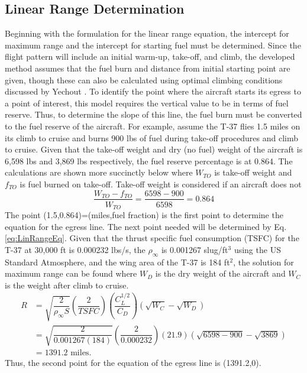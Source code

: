\subsection*{Linear Range Determination}
Beginning with the formulation for the linear range equation, the intercept for maximum range and the intercept for starting fuel must be determined. Since the flight pattern will include an initial warm-up, take-off, and climb, the developed method assumes that the fuel burn and distance from initial starting point are given, though these can also be calculated using optimal climbing conditions discussed by Yechout \cite{IntroACMechanics}. To identify the point where the aircraft starts its egress to a point of interest, this model requires the vertical value to be in terms of fuel reserve. Thus, to determine the slope of this line, the fuel burn must be converted to the fuel reserve of the aircraft. For example, assume the T-37 flies 1.5 miles on its climb to cruise and burns 900 lbs of fuel during take-off procedures and climb to cruise. Given that the take-off weight and dry (no fuel) weight of the aircraft is 6,598 lbs and 3,869 lbs respectively, the fuel reserve percentage is at 0.864. The calculations are shown more succinctly below where $W_{TO}$ is take-off weight and $f_{TO}$ is fuel burned on take-off. Take-off weight is considered if an aircraft does not 
\begin{equation*}
    \dfrac{W_{TO}- f_{TO}}{W_{TO}} = \dfrac{6598-900}{6598} = 0.864
\end{equation*}
The point (1.5,0.864)=(miles,fuel fraction) is the first point to determine the equation for the egress line. The next point needed will be determined by Eq. \ref{eq:LinRangeEq}. Given that the thrust specific fuel consumption (TSFC) for the T-37 at 30,000 ft is 0.000232 lbs/s, the $\rho_\infty$ is 0.001267 slug/ft$^3$ using the US Standard Atmosphere, and the wing area of the T-37 is 184 ft$^2$, the solution for maximum range can be found where $W_D$ is the dry weight of the aircraft and $W_C$ is the weight after climb to cruise.
\begin{align*}
    R  &= \sqrt{\dfrac{2}{\rho_{\infty}S}}\left(\dfrac{2}{TSFC}\right)\left(\dfrac{C_L^{1/2}}{C_D}\right)(\sqrt{W_C}-\sqrt{W_D})\\
    &= \sqrt{\dfrac{2}{0.001267(184)}}\left(\dfrac{2}{0.000232}\right)\left(21.9\right)(\sqrt{6598-900}-\sqrt{3869})\\
    &=1391.2\text{ miles}.
\end{align*}
Thus, the second point for the equation of the egress line is (1391.2,0).\par
